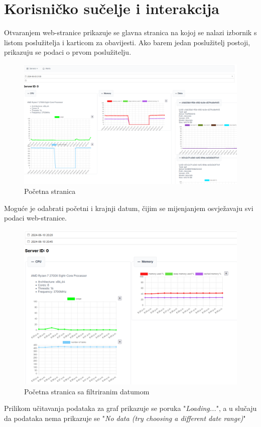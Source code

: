 \documentclass[zavrsnirad]{fer}
\begin{document}
\chapter{Korisničko sučelje i interakcija}
Otvaranjem web-stranice prikazuje se glavna stranica na kojoj se nalazi izbornik s listom poslužitelja i karticom za obavijesti. Ako barem jedan poslužitelj postoji, prikazuju se podaci o prvom poslužitelju.
\begin{figure}[htb]
	\centering
	\includegraphics[width=1\linewidth]{images/web_1.png}
	\caption{Početna stranica}
\end{figure}
\FloatBarrier

Moguće je odabrati početni i krajnji datum, čijim se mijenjanjem osvježavaju svi podaci web-stranice.
\begin{figure}[htb]
	\centering
	\includegraphics[width=1\linewidth]{images/web_2.png} 
	\caption{Početna stranica sa filtriranim datumom}
\end{figure}
\FloatBarrier
Prilikom učitavanja podataka za graf prikazuje se poruka "\textit{Loading...}", a u slučaju da podataka nema prikazuje se "\textit{No data (try choosing a different date range)}"
\end{document}

